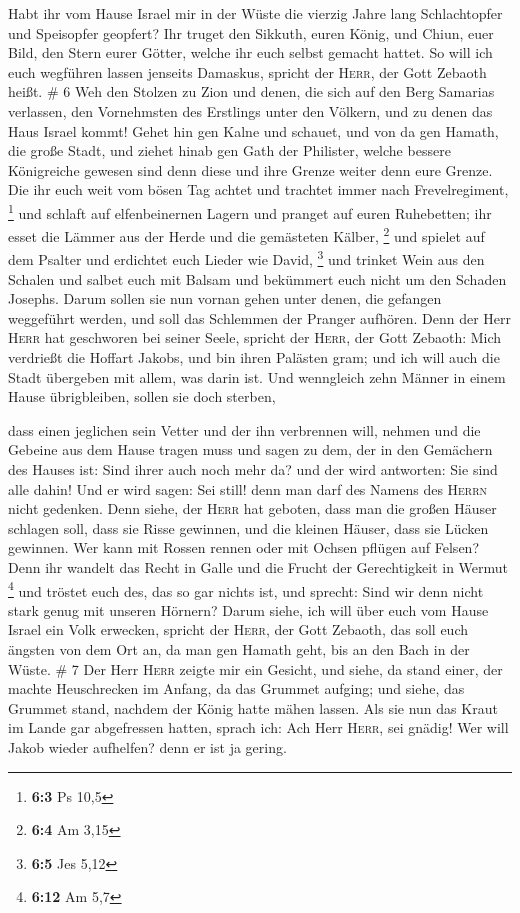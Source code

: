  Habt ihr vom Hause Israel mir in der Wüste die vierzig
Jahre lang Schlachtopfer und Speisopfer geopfert?  Ihr
truget den Sikkuth, euren König, und Chiun, euer Bild, den Stern eurer
Götter, welche ihr euch selbst gemacht hattet.  So will
ich euch wegführen lassen jenseits Damaskus, spricht der \textsc{Herr},
der Gott Zebaoth heißt. \# 6  Weh den Stolzen zu Zion und
denen, die sich auf den Berg Samarias verlassen, den Vornehmsten des
Erstlings unter den Völkern, und zu denen das Haus Israel kommt!
 Gehet hin gen Kalne und schauet, und von da gen Hamath,
die große Stadt, und ziehet hinab gen Gath der Philister, welche bessere
Königreiche gewesen sind denn diese und ihre Grenze weiter denn eure
Grenze.  Die ihr euch weit vom bösen Tag achtet und
trachtet immer nach Frevelregiment, \footnote{\textbf{6:3} Ps 10,5}
 und schlaft auf elfenbeinernen Lagern und pranget auf
euren Ruhebetten; ihr esset die Lämmer aus der Herde und die gemästeten
Kälber, \footnote{\textbf{6:4} Am 3,15}  und spielet auf
dem Psalter und erdichtet euch Lieder wie David, \footnote{\textbf{6:5}
  Jes 5,12}  und trinket Wein aus den Schalen und salbet
euch mit Balsam und bekümmert euch nicht um den Schaden Josephs.
 Darum sollen sie nun vornan gehen unter denen, die
gefangen weggeführt werden, und soll das Schlemmen der Pranger aufhören.
 Denn der Herr \textsc{Herr} hat geschworen bei seiner
Seele, spricht der \textsc{Herr}, der Gott Zebaoth: Mich verdrießt die
Hoffart Jakobs, und bin ihren Palästen gram; und ich will auch die Stadt
übergeben mit allem, was darin ist.  Und wenngleich zehn
Männer in einem Hause übrigbleiben, sollen sie doch sterben,

 dass einen jeglichen sein Vetter und der ihn verbrennen
will, nehmen und die Gebeine aus dem Hause tragen muss und sagen zu dem,
der in den Gemächern des Hauses ist: Sind ihrer auch noch mehr da? und
der wird antworten: Sie sind alle dahin! Und er wird sagen: Sei still!
denn man darf des Namens des \textsc{Herrn} nicht gedenken.
 Denn siehe, der \textsc{Herr} hat geboten, dass man die
großen Häuser schlagen soll, dass sie Risse gewinnen, und die kleinen
Häuser, dass sie Lücken gewinnen.  Wer kann mit Rossen
rennen oder mit Ochsen pflügen auf Felsen? Denn ihr wandelt das Recht in
Galle und die Frucht der Gerechtigkeit in Wermut \footnote{\textbf{6:12}
  Am 5,7}  und tröstet euch des, das so gar nichts ist,
und sprecht: Sind wir denn nicht stark genug mit unseren Hörnern?
 Darum siehe, ich will über euch vom Hause Israel ein
Volk erwecken, spricht der \textsc{Herr}, der Gott Zebaoth, das soll
euch ängsten von dem Ort an, da man gen Hamath geht, bis an den Bach in
der Wüste. \# 7  Der Herr \textsc{Herr} zeigte mir ein
Gesicht, und siehe, da stand einer, der machte Heuschrecken im Anfang,
da das Grummet aufging; und siehe, das Grummet stand, nachdem der König
hatte mähen lassen.  Als sie nun das Kraut im Lande gar
abgefressen hatten, sprach ich: Ach Herr \textsc{Herr}, sei gnädig! Wer
will Jakob wieder aufhelfen? denn er ist ja gering.

